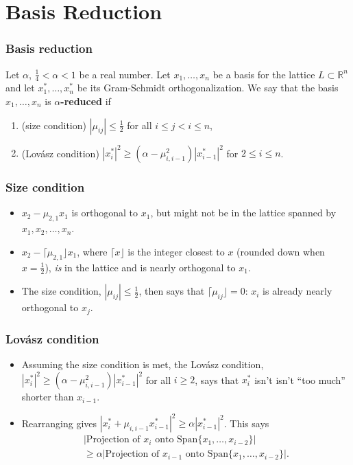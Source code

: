 \documentclass{beamer}
\newcommand{\reals}{\mathbb{R}}
\begin{document}
\section{Basis Reduction}
\begin{frame}
	\frametitle{Basis reduction}
	\begin{definition}
		Let $\alpha$, $\frac{1}{4}<\alpha<1$ be a real number. Let $x_1, \ldots, x_n$ be a basis for the lattice $L\subset \reals^n$ and let $x_1^*, \ldots, x_n^*$ be its Gram-Schmidt orthogonalization. We say that the basis $x_1, \ldots, x_n$ is \textbf{$\alpha$-reduced} if
		\begin{enumerate}
			\item (size condition) $|\mu_{ij}|\leq \frac{1}{2}$ for all $i\leq j<i\leq n$,
			\item (Lov\'asz condition) $|x_i^*|^2 \geq (\alpha - \mu_{i,i-1}^2)|x_{i-1}^*|^2$ for $2\leq i \leq n$.
		\end{enumerate}
	\end{definition}
\end{frame}

\begin{frame}
	\frametitle{Size condition}
	\begin{itemize}
		\item $x_2 - \mu_{2, 1}x_1$ is orthogonal to $x_1$, but might not be in the lattice spanned by $x_1, x_2, \ldots, x_n$.\pause
		\item $x_2 - \lceil \mu_{2,1}\rfloor x_1$, where $\lceil x\rfloor$ is the integer closest to $x$ (rounded down when $x=\frac{1}{2}$), \textit{is} in the lattice and is nearly orthogonal to $x_1$.\pause
		\item The size condition, $|\mu_{ij}|\leq \frac{1}{2}$, then says that $\lceil \mu_{ij}\rfloor = 0$: $x_i$ is already nearly orthogonal to $x_j$.
	\end{itemize}
\end{frame}

\begin{frame}
	\frametitle{Lov\'asz condition}
	\begin{itemize}
		\item Assuming the size condition is met, the Lov\'asz condition, $|x_i^*|^2 \geq (\alpha - \mu_{i,i-1}^2)|x_{i-1}^*|^2$ for all $i\geq 2$, says that $x_i^*$ isn't isn't ``too much'' shorter than $x_{i-1}$.\pause
		\item Rearranging gives $|x_i^* + \mu_{i,i-1}x_{i-1}^*|^2 \geq \alpha |x_{i-1}^*|^2$. This says
		\begin{multline*}
			|\text{Projection of }x_i\text{ onto Span}\{x_1, \ldots, x_{i-2}\}|\\
			\geq \alpha|\text{Projection of }x_{i-1}\text{ onto Span}\{x_1, \ldots, x_{i-2}\}|.
		\end{multline*}
	\end{itemize}
\end{frame}
\end{document}
